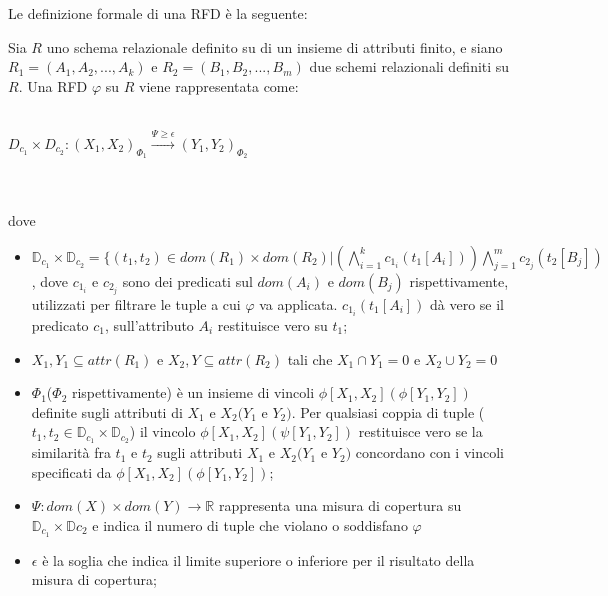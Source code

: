 Le definizione formale di una RFD è la seguente:
\begin{theorem}
Sia $R$ uno schema relazionale definito su di un insieme di attributi finito, e siano $R_1=(A_1,A_2,...,A_k)$ e $R_2=(B_1,B_2,...,B_m)$ due schemi relazionali definiti su $R$. Una RFD $\varphi$ su $R$ viene rappresentata come:
\\~\\
\centerline{$D_{c_1} \times D_{c_2}:(X_1,X_2)_{\Phi_1} \xrightarrow{\Psi\geq\epsilon}(Y_1,Y_2)_{\Phi_2}$}
\\~\\
dove 
\begin{itemize}
\item $\mathbb{D}_{c_1}\times \mathbb{D}_{c_2} = \{(t_1,t_2)\in dom(R_1)\times dom(R_2)|(\bigwedge_{i=1}^{k} c_{1_i}(t_1[A_i])) \bigwedge_{j=1}^{m} c_{2_j}(t_2[B_j])$, dove $c_{1_i}$ e $c_{2_j}$ sono dei predicati sul $dom(A_i)$ e $dom(B_j)$ rispettivamente, utilizzati per filtrare le tuple a cui $\varphi$ va applicata.
$c_{1_i}(t_1[A_i])$ dà vero se il predicato $c_1$, sull'attributo $A_i$ restituisce vero su $t_1$;
\item $X_1,Y_1 \subseteq attr(R_1)$ e $X_2,Y\subseteq attr(R_2)$ tali che $X_1\cap Y_1=0$ e $X_2\cup Y_2=0 $
\item $\Phi_1$($\Phi_2$ rispettivamente) è un insieme di vincoli $\phi[X_1,X_2](\phi[Y_1,Y_2])$ definite sugli attributi di $X_1$ e $X_2(Y_1$ e $Y_2)$. Per qualsiasi coppia di tuple ($t_1,t_2 \in \mathbb{D}_{c_1} \times \mathbb{D}_{c_2}$) il vincolo $\phi[X_1,X_2](\psi[Y_1,Y_2])$ restituisce vero se la similarità fra $t_1$ e $t_2$ sugli attributi $X_1$ e $X_2(Y_1$ e $Y_2)$ concordano con i vincoli specificati da $\phi[X_1,X_2](\phi[Y_1,Y_2])$;
\item $\Psi: dom(X) \times dom(Y)\xrightarrow{}\mathbb{R}$ rappresenta una misura di copertura su $\mathbb{D}_{c_1} \times \mathbb{D}{c_2}$ e indica il numero di tuple che violano o soddisfano $\varphi$
\item $\epsilon$ è la soglia che indica il limite superiore o inferiore per il risultato della misura di copertura;
\end{itemize}
\end{theorem}


